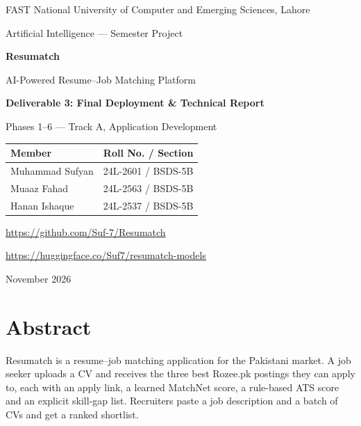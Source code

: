 \documentclass[11pt,a4paper]{article}
\begin{document}
\begin{titlepage}
\centering
{\large FAST National University of Computer and Emerging Sciences, Lahore\par}
\vspace{0.3em}
{\normalsize Artificial Intelligence --- Semester Project\par}
\vspace{4.5em}
{\fontsize{40}{46}\selectfont\bfseries\color{rmblue} Resumatch\par}
\vspace{0.6em}
{\Large AI-Powered Resume--Job Matching Platform\par}
\vspace{3em}
{\large\bfseries Deliverable 3: Final Deployment \& Technical Report\par}
\vspace{0.4em}
{\normalsize Phases 1--6 --- Track A, Application Development\par}
\vspace{4em}
\begin{tabular}{ll}
\toprule
\textbf{Member} & \textbf{Roll No. / Section}\\
\midrule
Muhammad Sufyan & 24L-2601 / BSDS-5B\\
Muaaz Fahad & 24L-2563 / BSDS-5B\\
Hanan Ishaque & 24L-2537 / BSDS-5B\\
\bottomrule
\end{tabular}
\vspace{2.5em}
{\normalsize\url{https://github.com/Suf-7/Resumatch}\par}
\vspace{0.4em}
{\normalsize\url{https://huggingface.co/Suf7/resumatch-models}\par}
\vfill
{\large November 2026\par}
\end{titlepage}

\tableofcontents
\thispagestyle{fancy}
\newpage

\section{Abstract}
Resumatch is a resume--job matching application for the Pakistani market. A job seeker uploads a
CV and receives the three best Rozee.pk postings they can apply to, each with an apply link, a
learned MatchNet score, a rule-based ATS score and an explicit skill-gap list. Recruiters paste a
job description and a batch of CVs and get a ranked shortlist.
\end{document}
